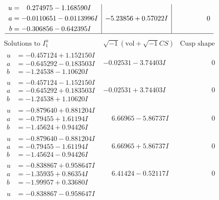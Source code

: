\documentclass[1p]{elsarticle_modified}
\theoremstyle{definition}
\newcommand{\I}{\sqrt{-1}}
\begin{document}
$$\begin{array}{c|c|c}
\begin{aligned}
u &= \phantom{-}0.274975 - 1.168590 I \\
a &= -0.0110651 - 0.0113996 I \\
b &= -0.306856 - 0.642395 I\end{aligned}
 & -5.23856 + 0.57022 I & \phantom{-0.000000 } 0\\
 \hline 
 \end{array}$$\newpage$$\begin{array}{c|c|c}  
\text{Solutions to }I^u_{1}& \I (\text{vol} + \sqrt{-1}CS) & \text{Cusp shape}\\
 \hline 
\begin{aligned}
u &= -0.457124 + 1.152150 I \\
a &= -0.645292 - 0.183503 I \\
b &= -1.24538 - 1.10620 I\end{aligned}
 & -0.02531 - 3.74403 I & \phantom{-0.000000 } 0 \\ \hline\begin{aligned}
u &= -0.457124 - 1.152150 I \\
a &= -0.645292 + 0.183503 I \\
b &= -1.24538 + 1.10620 I\end{aligned}
 & -0.02531 + 3.74403 I & \phantom{-0.000000 } 0 \\ \hline\begin{aligned}
u &= -0.879640 + 0.881204 I \\
a &= -0.79455 + 1.61194 I \\
b &= -1.45624 + 0.94426 I\end{aligned}
 & \phantom{-}6.66965 - 5.86737 I & \phantom{-0.000000 } 0 \\ \hline\begin{aligned}
u &= -0.879640 - 0.881204 I \\
a &= -0.79455 - 1.61194 I \\
b &= -1.45624 - 0.94426 I\end{aligned}
 & \phantom{-}6.66965 + 5.86737 I & \phantom{-0.000000 } 0 \\ \hline\begin{aligned}
u &= -0.838867 + 0.958647 I \\
a &= -1.35935 + 0.86354 I \\
b &= -1.99957 + 0.33680 I\end{aligned}
 & \phantom{-}6.41424 - 0.52117 I & \phantom{-0.000000 } 0 \\ \hline\begin{aligned}
u &= -0.838867 - 0.958647 I \\

\end{aligned}
\end{array}$$
\end{document}
